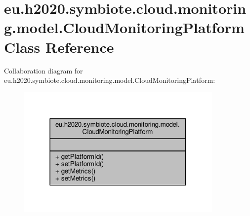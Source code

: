 \hypertarget{classeu_1_1h2020_1_1symbiote_1_1cloud_1_1monitoring_1_1model_1_1CloudMonitoringPlatform}{}\section{eu.\+h2020.\+symbiote.\+cloud.\+monitoring.\+model.\+Cloud\+Monitoring\+Platform Class Reference}
\label{classeu_1_1h2020_1_1symbiote_1_1cloud_1_1monitoring_1_1model_1_1CloudMonitoringPlatform}


Collaboration diagram for eu.\+h2020.\+symbiote.\+cloud.\+monitoring.\+model.\+Cloud\+Monitoring\+Platform\+:\nopagebreak
\begin{figure}[H]
\begin{center}
\leavevmode
\includegraphics[width=286pt]{classeu_1_1h2020_1_1symbiote_1_1cloud_1_1monitoring_1_1model_1_1CloudMonitoringPlatform__coll__graph}
\end{center}
\end{figure}
